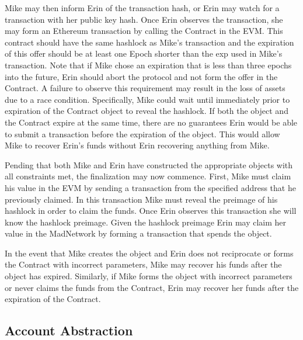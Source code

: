 Mike may then inform Erin of the transaction hash, or Erin may watch
for a transaction with her public key hash.
Once Erin observes the transaction, she may form an Ethereum
transaction by calling the \AtomicSwap{}Contract in the EVM.
This contract should have the same hashlock as Mike's transaction and
the expiration of this offer should be at least one Epoch shorter than
the exp used in Mike's transaction.
Note that if Mike chose an expiration that is less than three epochs
into the future, Erin should abort the protocol and not form the offer
in the \AtomicSwap{}Contract.
A failure to observe this requirement may result in the loss of assets
due to a race condition.
Specifically, Mike could wait until immediately prior to expiration of
the \AtomicSwap{}Contract object to reveal the hashlock.
If both the \AtomicSwap{} object and the \AtomicSwap{}Contract expire at the
same time, there are no guarantees Erin would be able to submit a
transaction before the expiration of the \AtomicSwap{} object.
This would allow Mike to recover Erin's funds without Erin recovering
anything from Mike.

Pending that both Mike and Erin have constructed the appropriate
objects with all constraints met, the finalization may now commence.
First, Mike must claim his value in the EVM by sending a transaction
from the specified address that he previously claimed.
In this transaction Mike must reveal the preimage of his hashlock in
order to claim the funds.
Once Erin observes this transaction she will know the hashlock preimage.
Given the hashlock preimage Erin may claim her value in the MadNetwork
by forming a transaction that spends the \AtomicSwap{} object.

In the event that Mike creates the \AtomicSwap{} object and Erin does not
reciprocate or forms the \AtomicSwap{}Contract with incorrect parameters,
Mike may recover his funds after the \AtomicSwap{} object has expired.
Similarly, if Mike forms the \AtomicSwap{} object with incorrect
parameters or never claims the funds from the \AtomicSwap{}Contract, Erin
may recover her funds after the expiration of the \AtomicSwap{}Contract.


\subsection{Account Abstraction}

